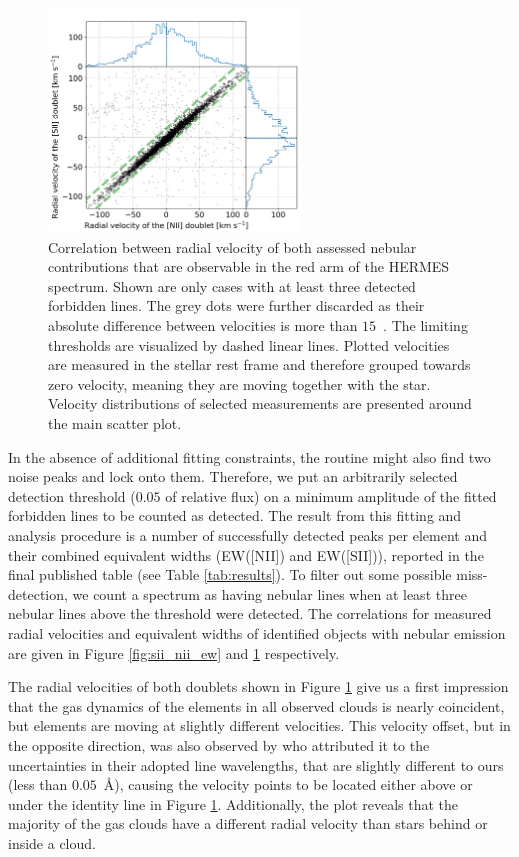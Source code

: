 \begin{figure}
	\centering
	\includegraphics[width=0.6\textwidth]{sii_nii_rv.png}
	\caption{Correlation between radial velocity of both assessed nebular contributions that are observable in the red arm of the HERMES spectrum. Shown are only cases with at least three detected forbidden lines. The grey dots were further discarded as their absolute difference between velocities is more than $15$~\kms. The limiting thresholds are visualized by dashed linear lines. Plotted velocities are measured in the stellar rest frame and therefore grouped towards zero velocity, meaning they are moving together with the star. Velocity distributions of selected measurements are presented around the main scatter plot.}
	\label{fig:sii_nii_rv}
\end{figure}

In the absence of additional fitting constraints, the routine might also find two noise peaks and lock onto them. Therefore, we put an arbitrarily selected detection threshold ($0.05$ of relative flux) on a minimum amplitude of the fitted forbidden lines to be counted as detected. The result from this fitting and analysis procedure is a number of successfully detected peaks per element and their combined equivalent widths (EW([NII]) and EW([SII])), reported in the final published table (see Table \ref{tab:results}). To filter out some possible miss-detection, we count a spectrum as having nebular lines when at least three nebular lines above the threshold were detected. The correlations for measured radial velocities and equivalent widths of identified objects with nebular emission are given in Figure \ref{fig:sii_nii_ew} and \ref{fig:sii_nii_rv} respectively.

The radial velocities of both doublets shown in Figure \ref{fig:sii_nii_rv} give us a first impression that the gas dynamics of the elements in all observed clouds is nearly coincident, but elements are moving at slightly different velocities. This velocity offset, but in the opposite direction, was also observed by \citet{2016A&A...591A..74D, 2017A&A...604A.135D} who attributed it to the uncertainties in their adopted line wavelengths, that are slightly different to ours (less than $0.05$~\AA), causing the velocity points to be located either above or under the identity line in Figure \ref{fig:sii_nii_rv}. Additionally, the plot reveals that the majority of the gas clouds have a different radial velocity than stars behind or inside a cloud.

